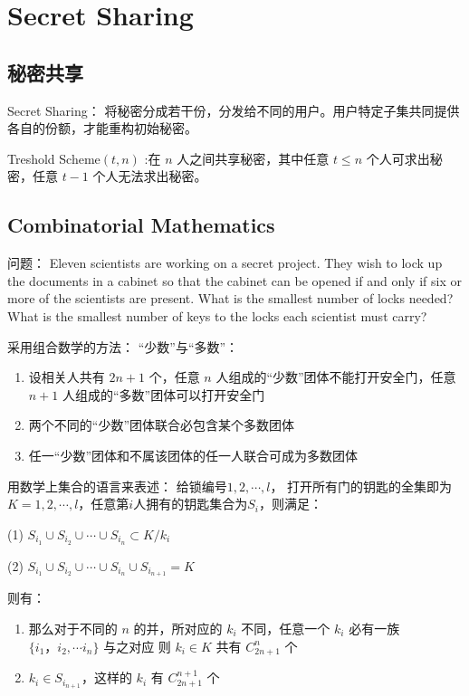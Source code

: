 \documentclass[12pt, a4paper]{article}
\begin{document}
\section{Secret Sharing}
\subsection [short]{秘密共享}

Secret Sharing： 将秘密分成若干份，分发给不同的用户。用户特定子集共同提供各自的份额，才能重构初始秘密。

Treshold Scheme$(t,n)$ :在 $n$ 人之间共享秘密，其中任意 $t\le n$ 个人可求出秘密，任意 $t-1$ 个人无法求出秘密。
\subsection[short]{Combinatorial Mathematics}
问题：
Eleven scientists are working on a secret project. They wish to lock up the documents in a cabinet so that the cabinet can be opened if and only if six or more of the scientists are present. What is the smallest number of locks needed? What is the smallest number of keys to the locks each scientist must carry?


采用组合数学的方法：
“少数”与“多数”：
\begin{enumerate}

    \item 设相关人共有 $2n+1$ 个，任意 $n$ 人组成的“少数”团体不能打开安全门，任意 $n+1$ 人组成的“多数”团体可以打开安全门  
    \item 两个不同的“少数”团体联合必包含某个多数团体  
    \item 任一“少数”团体和不属该团体的任一人联合可成为多数团体        
\end{enumerate}

用数学上集合的语言来表述： 给锁编号$1,2,\cdots,l$， 打开所有门的钥匙的全集即为 $K = {1,2,\cdots,l}$，任意第$i$人拥有的钥匙集合为$S_i$，则满足：

(1) $S_{i_1} \cup S_{i_2}\cup \cdots\cup S_{i_n} \subset K/k_i$\par
(2) $S_{i_1} \cup S_{i_2}\cup \cdots \cup S_{i_n}\cup S_{i_{n+1}} = K$
 

则有：
\begin{enumerate}
    \item 那么对于不同的 $n$ 的并，所对应的 $k_i$ 不同，任意一个 $k_i$ 必有一族 $\{i_1，i_2,\cdots i_n\}$ 与之对应 则 $k_i\in K$ 共有 $C_{2n+1}^n$ 个
    \item $k_i \in S_{i_{n+1}}$，这样的 $k_i$ 有 $C_{2n+1}^{n+1}$ 个
\end{enumerate} 
\end{document}

